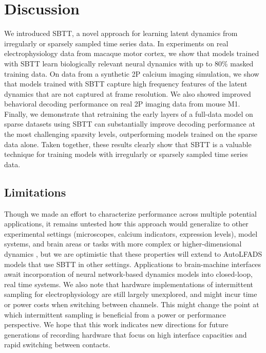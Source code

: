 \documentclass{article}
\begin{document}
\section{Discussion}

We introduced SBTT, a novel approach for learning latent dynamics from irregularly or sparsely sampled time series data. In experiments on real electrophysiology data from macaque motor cortex, we show that models trained with SBTT learn biologically relevant neural dynamics with up to 80\% masked training data. On data from a synthetic 2P calcium imaging simulation, we show that models trained with SBTT capture high frequency features of the latent dynamics that are not captured at frame resolution. We also showed improved behavioral decoding performance on real 2P imaging data from mouse M1. Finally, we demonstrate that retraining the early layers of a full-data model on sparse datasets using SBTT can substantially improve decoding performance at the most challenging sparsity levels, outperforming models trained on the sparse data alone. Taken together, these results clearly show that SBTT is a valuable technique for training models with irregularly or sparsely sampled time series data.

\subsection{Limitations}

Though we made an effort to characterize performance across multiple potential applications, it remains untested how this approach would generalize to other experimental settings (microscopes, calcium indicators, expression levels), model systems, and brain areas or tasks with more complex or higher-dimensional dynamics \cite{keshtkaran2021large}, but we are optimistic that these properties will extend to AutoLFADS models that use SBTT in other settings. Applications to brain-machine interfaces await incorporation of neural network-based dynamics models into closed-loop, real time systems. We also note that hardware implementations of intermittent sampling for electrophysiology are still largely unexplored, and might incur time or power costs when switching between channels. This might change the point at which intermittent sampling is beneficial from a power or performance perspective. We hope that this work indicates new directions for future generations of recording hardware that focus on high interface capacities and rapid switching between contacts.
\end{document}
